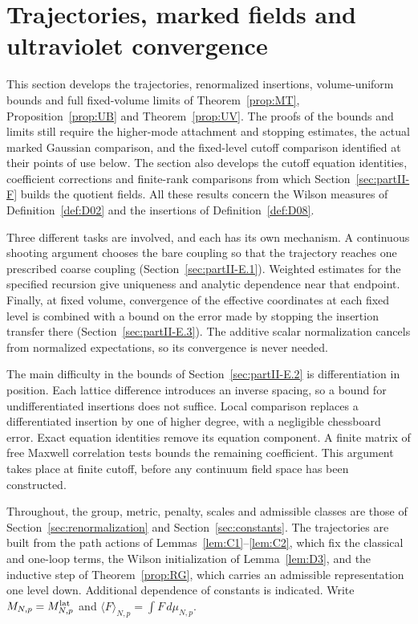 \section{Trajectories, marked fields and ultraviolet convergence}\label{sec:partII-E}

This section develops the trajectories, renormalized insertions, volume-uniform bounds and full fixed-volume limits of Theorem~\ref{prop:MT}, Proposition~\ref{prop:UB} and Theorem~\ref{prop:UV}. The proofs of the bounds and limits still require the higher-mode attachment and stopping estimates, the actual marked Gaussian comparison, and the fixed-level cutoff comparison identified at their points of use below. The section also develops the cutoff equation identities, coefficient corrections and finite-rank comparisons from which Section~\ref{sec:partII-F} builds the quotient fields. All these results concern the Wilson measures of Definition~\ref{def:D02} and the insertions of Definition~\ref{def:D08}.

Three different tasks are involved, and each has its own mechanism. A continuous shooting argument chooses the bare coupling so that the trajectory reaches one prescribed coarse coupling (Section~\ref{sec:partII-E.1}). Weighted estimates for the specified recursion give uniqueness and analytic dependence near that endpoint. Finally, at fixed volume, convergence of the effective coordinates at each fixed level is combined with a bound on the error made by stopping the insertion transfer there (Section~\ref{sec:partII-E.3}). The additive scalar normalization cancels from normalized expectations, so its convergence is never needed.

The main difficulty in the bounds of Section~\ref{sec:partII-E.2} is differentiation in position. Each lattice difference introduces an inverse spacing, so a bound for undifferentiated insertions does not suffice. Local comparison replaces a differentiated insertion by one of higher degree, with a negligible chessboard error. Exact equation identities remove its equation component. A finite matrix of free Maxwell correlation tests bounds the remaining coefficient. This argument takes place at finite cutoff, before any continuum field space has been constructed.

Throughout, the group, metric, penalty, scales and admissible classes are those of Section~\ref{sec:renormalization} and Section~\ref{sec:constants}. The trajectories are built from the path actions of Lemmas~\ref{lem:C1}--\ref{lem:C2}, which fix the classical and one-loop terms, the Wilson initialization of Lemma~\ref{lem:D3}, and the inductive step of Theorem~\ref{prop:RG}, which carries an admissible representation one level down. Additional dependence of constants is indicated. Write $M_{N,p}=M^{\mathrm{lat}}_{N,p}$ and $\langle F\rangle_{N,p}=\int F\,d\mu_{N,p}$.

